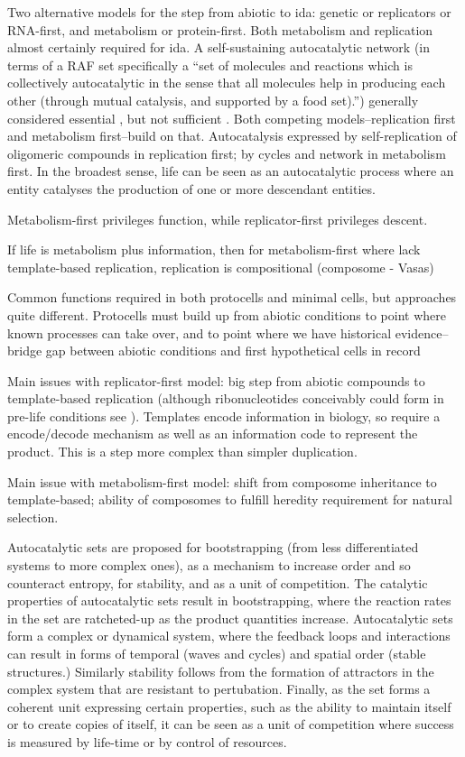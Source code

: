 	Two alternative models for the step from abiotic to \gls{ida}: genetic
	or replicators or RNA-first, and metabolism or protein-first. Both
	metabolism and replication almost certainly required for \gls{ida}. A
	self-sustaining autocatalytic network (in terms of a RAF set
	specifically a ``set of molecules and reactions which is collectively
	autocatalytic in the sense that all molecules help in producing each
	other (through mutual catalysis, and supported by a food set).'')
	generally considered essential \autocite{Pross2013}, but not sufficient
	\autocite{Hordijk2011}. Both competing models--replication first and
	metabolism first--build on that. Autocatalysis expressed by
	self-replication of oligomeric compounds in replication first; by cycles
	and network in metabolism first. In the broadest sense, life can be seen
	as an autocatalytic process where an entity catalyses the production of
	one or more descendant entities.
	
	Metabolism-first privileges function, while replicator-first privileges
	descent.
	
	If life is metabolism plus information, then for metabolism-first where
	lack template-based replication, replication is compositional (composome
	- Vasas)
	
	Common functions required in both protocells and minimal cells, but
	approaches quite different. Protocells must build up from abiotic
	conditions to point where known processes can take over, and to point
	where we have historical evidence--bridge gap between abiotic
	conditions and first hypothetical cells in record
	
	Main issues with replicator-first model: big step from abiotic compounds
	to template-based replication (although ribonucleotides conceivably
	could form in pre-life conditions see \autocite{Powner2009}). Templates
	encode information in biology, so require a encode/decode mechanism as
	well as an information code to represent the product. This is a step
	more complex than simpler duplication.
	
	Main issue with metabolism-first model: shift from composome inheritance
	to template-based; ability of composomes to fulfill heredity requirement
	for natural selection.
	
	Autocatalytic sets are proposed for bootstrapping (from less
	differentiated systems to more complex ones), as a mechanism to increase
	order and so counteract entropy, for stability, and as a unit of
	competition. The catalytic properties of autocatalytic sets result in
	bootstrapping, where the reaction rates in the set are ratcheted-up as
	the product quantities increase. Autocatalytic sets form a complex or
	dynamical system, where the feedback loops and interactions can result
	in forms of temporal (waves and cycles) and spatial order (stable
	structures.) Similarly stability follows from the formation of
	attractors in the complex system that are resistant to pertubation.
	Finally, as the set forms a coherent unit expressing certain properties,
	such as the ability to maintain itself or to create copies of itself, it
	can be seen as a unit of competition where success is measured by
	life-time or by control of resources.
	
